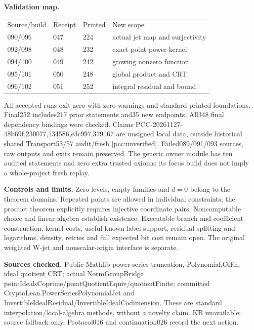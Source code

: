 \documentclass[11pt]{article}
\begin{document}
\textbf{Validation map.}
\begin{center}\begin{tabular}{llll}
Source/build&Receipt&Printed&New scope\\
090/096&047&224&actual jet map and surjectivity\\
092/098&048&232&exact point-power kernel\\
094/100&049&242&growing nonzero function\\
095/101&050&248&global product and CRT\\
096/102&051&252&integral residual and bound
\end{tabular}\end{center}
All accepted runs exit zero with zero warnings and standard printed
foundations. Final252 includes217 prior statements and35 new endpoints.
All348 final dependency bindings were checked. Claims
PCC-20261127-48b69f,230077,134586,e3c997,379167 are unsigned local data,
outside historical shared Transport53/57 audit/fresh [pcc:unverified].
Failed089/091/093 sources, raw outputs and exits remain preserved.
The generic owner module has ten audited statements and zero extra trusted
axioms; its focus build does not imply a whole-project fresh replay.

\textbf{Controls and limits.}
Zero levels, empty families and \(d=0\) belong to the theorem domains.
Repeated points are allowed in individual constraints; the product theorem
explicitly requires injective coordinate pairs. Noncomputable choice and
linear algebra establish existence. Executable branch and coefficient
construction, kernel costs, useful known-label support, residual splitting
and logarithms, density, retries and full expected bit cost remain open.
The original weighted W-jet and nonscalar-origin interface is separate.

\textbf{Sources checked.}
Public Mathlib power-series truncation, Polynomial.OfFn, ideal quotient CRT;
actual NormGroupBridge pointIdealsCoprime/pointQuotientEquiv/quotientFinite;
committed CryptoLean.PowerSeriesPolynomialJet and
InvertibleIdealResidual/InvertibleIdealCodimension. These are standard
interpolation/local-algebra methods, without a novelty claim. KB unavailable;
source fallback only. Protocol016 and continuation026 record the next action.
\end{document}

